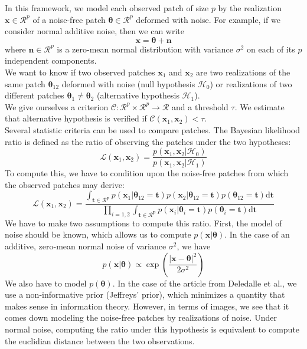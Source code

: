 \documentclass[runningheads]{llncs}
\begin{document}
In this framework, we model each observed patch of size $p$ by the realization $\mathbf{x} \in \mathcal{R}^p$ of a noise-free patch $\boldsymbol{\theta} \in \mathcal{R}^p$ deformed with noise. For example, if we consider normal additive noise, then we can write
\[
\mathbf{x} = \boldsymbol{\theta} + \mathbf{n}
\]
where $\mathbf{n} \in \mathcal{R}^p$ is a zero-mean normal distribution with variance $\sigma^2$ on each of its $p$ independent components. \\
We want to know if two observed patches $\mathbf{x}_1$ and $\mathbf{x}_2$ are two realizations of the same patch $\boldsymbol{\theta}_{12}$ deformed with noise (null hypothesis $\mathcal{H}_0$) or realizations of two different patches $\boldsymbol{\theta}_1 \neq \boldsymbol{\theta}_2$ (alternative hypothesis $\mathcal{H}_1$). \\
We give ourselves a criterion $\mathcal{C} : \mathcal{R}^p \times \mathcal{R}^p \rightarrow \mathcal{R}$ and a threshold $\tau$. We estimate that alternative hypothesis is verified if $\mathcal{C}(\mathbf{x}_1,\mathbf{x}_2)<\tau$. \\
Several statistic criteria can be used to compare patches. The Bayesian likelihood ratio is defined as the ratio of observing the patches under the two hypotheses:
\[
\mathcal{L}(\mathbf{x}_1,\mathbf{x}_2)=\frac{p(\mathbf{x}_1,\mathbf{x}_2|\mathcal{H}_0)}{p(\mathbf{x}_1,\mathbf{x}_2|\mathcal{H}_1)}
\]
To compute this, we have to condition upon the noise-free patches from which the observed patches may derive:
\[
\mathcal{L}(\mathbf{x}_1,\mathbf{x}_2)=
\frac{\int_{\mathbf{t \in \mathcal{R}^p}} p(\mathbf{x}_1|\boldsymbol{\theta}_{12}=\mathbf{t}) p(\mathbf{x}_2|\boldsymbol{\theta}_{12}=\mathbf{t})p(\boldsymbol{\theta}_{12}=\mathbf{t})\mathrm{d}\mathbf{t}}{\prod_{i=1,2}\int_{\mathbf{t \in \mathcal{R}^p}} p(\mathbf{x}_i|\boldsymbol{\theta}_{i}=\mathbf{t}) p(\boldsymbol{\theta}_{i}=\mathbf{t})\mathrm{d}\mathbf{t}}
\]
We have to make two assumptions to compute this ratio. First, the model of noise should be known, which allows us to compute $p(\mathbf{x}|\boldsymbol\theta)$. In the case of an additive, zero-mean normal noise of variance $\sigma^2$, we have
\[
p(\mathbf{x}|\boldsymbol\theta)\propto\exp\left(\frac{|\mathbf{x}-\boldsymbol\theta|^2}{2\sigma^2}\right)
\]
We also have to model $p(\boldsymbol\theta)$. In the case of the article from Deledalle et al.\cite{Deledalle:2012}, we use a non-informative prior (Jeffreys' prior), which minimizes a quantity that makes sense in information theory. However, in terms of images, we see that it comes down modeling the noise-free patches by realizations of noise. Under normal noise, computing the ratio under this hypothesis is equivalent to compute the euclidian distance between the two observations.\\
\end{document}
